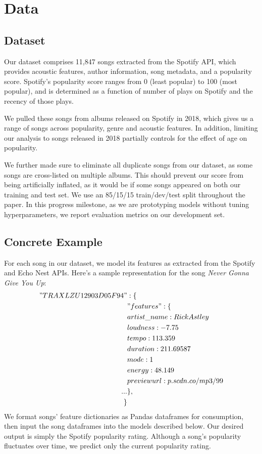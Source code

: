 \documentclass[journal]{IEEEtran}
\begin{document}
\section{Data}
\subsection{Dataset}
Our dataset comprises 11,847 songs extracted from the Spotify API, which provides acoustic features, author information, song metadata, and a popularity score. Spotify's popularity score ranges from 0 (least popular) to 100 (most popular), and is determined as a function of number of plays on Spotify and the recency of those plays.

We pulled these songs from albums released on Spotify in 2018, which gives us a range of songs across popularity, genre and acoustic features. In addition, limiting our analysis to songs released in 2018 partially controls for the effect of age on popularity.

We further made sure to eliminate all duplicate songs from our dataset, as some songs are cross-listed on multiple albums. This should prevent our score from being artificially inflated, as it would be if some songs appeared on both our training and test set. We use an 85/15/15 train/dev/test split throughout the paper. In this progress milestone, as we are prototyping models without tuning hyperparameters, we report evaluation metrics on our development set.


\subsection{Concrete Example}
For each song in our dataset, we model its features as extracted from the Spotify and Echo Nest APIs. Here's a sample representation for the song \textit{Never Gonna Give You Up}:
\begin{align*}
    "TRAXLZU12903D05F94 "&: \{ \\
  &"features": \{\\
  &artist\_name: Rick Astley \\
  &loudness: -7.75 \\
  &tempo: 113.359 \\
  &duration: 211.69587 \\
  &mode: 1 \\
  &energy: 48.149 \\
  &previewurl: p.scdn.co/mp3/99 \\
  ...
        &\},\\
    \}
\end{align*}
We format songs' feature dictionaries as Pandas dataframes for consumption, then input the song dataframes into the models described below. Our desired output is simply the Spotify popularity rating. Although a song's popularity fluctuates over time, we predict only the current popularity rating.
\end{document}
